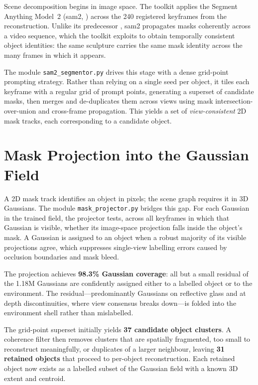 Scene decomposition begins in image space. The toolkit applies the Segment Anything Model~2 (\acrshort{sam}2, \parencite{Ravi2024SAM2}) across the 240 registered keyframes from the reconstruction. Unlike its predecessor \parencite{Kirillov2023}, \acrshort{sam}2 propagates masks coherently across a video sequence, which the toolkit exploits to obtain temporally consistent object identities: the same sculpture carries the same mask identity across the many frames in which it appears.

The module \texttt{sam2\_segmentor.py} drives this stage with a dense grid-point prompting strategy. Rather than relying on a single seed per object, it tiles each keyframe with a regular grid of prompt points, generating a superset of candidate masks, then merges and de-duplicates them across views using mask intersection-over-union and cross-frame propagation. This yields a set of \emph{view-consistent} 2D mask tracks, each corresponding to a candidate object.

\section{Mask Projection into the Gaussian Field}
\label{sec:sg-projection}

A 2D mask track identifies an object in pixels; the scene graph requires it in 3D Gaussians. The module \texttt{mask\_projector.py} bridges this gap. For each Gaussian in the trained field, the projector tests, across all keyframes in which that Gaussian is visible, whether its image-space projection falls inside the object's mask. A Gaussian is assigned to an object when a robust majority of its visible projections agree, which suppresses single-view labelling errors caused by occlusion boundaries and mask bleed.

\begin{technote}
The projection achieves \textbf{98.3\% Gaussian coverage}: all but a small residual of the 1.18M Gaussians are confidently assigned either to a labelled object or to the environment. The residual---predominantly Gaussians on reflective glass and at depth discontinuities, where view consensus breaks down---is folded into the environment shell rather than mislabelled.
\end{technote}

The grid-point superset initially yields \textbf{37 candidate object clusters}. A coherence filter then removes clusters that are spatially fragmented, too small to reconstruct meaningfully, or duplicates of a larger neighbour, leaving \textbf{31 retained objects} that proceed to per-object reconstruction. Each retained object now exists as a labelled subset of the Gaussian field with a known 3D extent and centroid.

